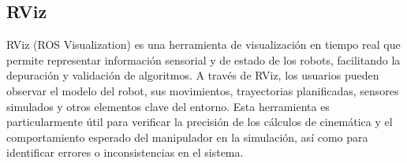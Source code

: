 \subsection{RViz}
RViz (ROS Visualization) es una herramienta de visualización en tiempo real que permite representar información sensorial y de estado de los robots, facilitando la depuración y validación de algoritmos. A través de RViz, los usuarios pueden observar el modelo del robot, sus movimientos, trayectorias planificadas, sensores simulados y otros elementos clave del entorno. Esta herramienta es particularmente útil para verificar la precisión de los cálculos de cinemática y el comportamiento esperado del manipulador en la simulación, así como para identificar errores o inconsistencias en el sistema.


